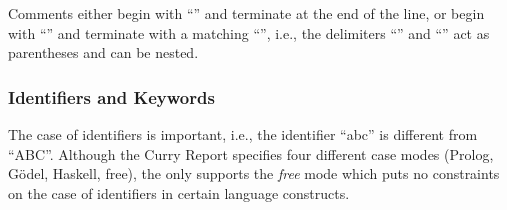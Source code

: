 Comments either begin with \enquote{\term{-{}-}} and terminate at the end
of the line,
or begin with \enquote{\term{\{-}} and terminate with a matching
\enquote{\term{-\}}}, i.e., the delimiters \enquote{\term{\{-}} and
\enquote{\term{-\}}} act as parentheses and can be nested.

\subsubsection{Identifiers and Keywords}

The case of identifiers is important, i.e., the identifier \enquote{abc}
is different from \enquote{ABC}.
Although the Curry Report specifies four different case modes
(Prolog, G\"odel, Haskell, free),
the \CYS only supports the \emph{free} mode
which puts no constraints on the case of identifiers in certain
language constructs.

